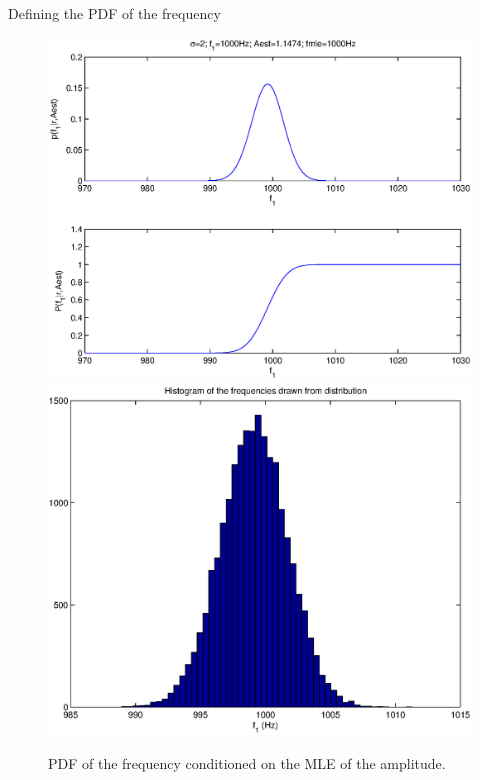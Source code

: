 ﻿\documentclass[mathserif]{beamer}
\begin{document}
	\begin{frame}{Defining the PDF of the frequency}
		\begin{figure}
			\centering
			\includegraphics[scale=0.345]{./img3/singleTonewoMHFig11.eps}
			\includegraphics[scale=0.345]{./img3/singleTonewoMHFig12.eps}
			\caption{PDF of the frequency conditioned on the MLE of the amplitude.}
		\end{figure}
	\end{frame}	
	

	
\end{document}
